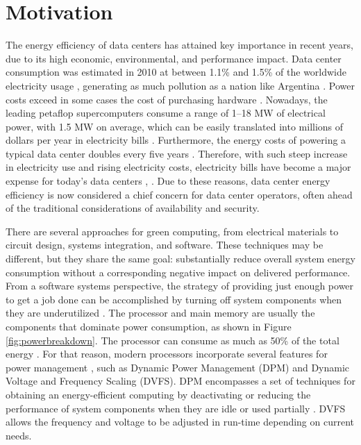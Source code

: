 
\section{Motivation}
The energy efficiency of data centers has attained key importance in recent years, due to its high economic, environmental, and performance impact. 
Data center consumption was estimated in 2010 at between 1.1\% and 1.5\% of the worldwide electricity usage \cite{Dayarathna2016DataSurvey,Corcoran2017EmergingICT}, generating as much pollution as a nation like Argentina  \cite{Mathew2012Energy-awareNetworks}.
Power costs exceed in some cases the cost of purchasing hardware \cite{Rivoire2007ModelsOptimizations}. 
Nowadays, the leading petaflop supercomputers consume a range of 1–18 MW of electrical power, with 1.5 MW on average, which can be easily translated into millions of dollars per year in electricity bills \cite{Group2012HandbookSahni}.
Furthermore, the energy costs of powering a typical data center doubles every five years \cite{Buyya2013MasteringProgramming}.
Therefore, with such steep increase in electricity use and rising electricity costs, electricity bills have become a major expense for today’s data centers \cite{Poess2008EnergyResults}, \cite{Gao2013QualityCenters}. 
Due to these reasons, data center energy efficiency is now considered a chief concern for data center operators, often ahead of the traditional considerations of availability and security.

There are several approaches for green computing, from electrical materials to circuit design, systems integration, and software. These techniques may be different, but they share the same goal: substantially reduce overall system energy consumption without a corresponding negative impact on delivered performance. 
From a software systems perspective, the strategy of providing just enough power to get a job done can be accomplished by turning off system components when they are underutilized \cite{Mathew2012Energy-awareNetworks}.
The processor and main memory are usually the components that dominate power consumption, as shown in Figure  \ref{fig:powerbreakdown}.
The processor can consume as much as 50\% of the total energy \cite{Fan2007, Barroso2007TheComputing, Malladi2012TowardsDRAM}. For that reason, modern processors incorporate several features for power management \cite{Rotem2012Power-managementBridge, Brown2005, Hackenberg2015}, such as Dynamic Power Management (DPM) and Dynamic Voltage and Frequency Scaling (DVFS). 
DPM encompasses a set of techniques for obtaining an energy-efficient computing by deactivating or reducing the performance of system components when they are idle or used partially \cite{Shuja2012Energy-efficientCenters, Benini2000AManagement}.
DVFS allows the frequency and voltage to be adjusted in run-time depending on current needs.

